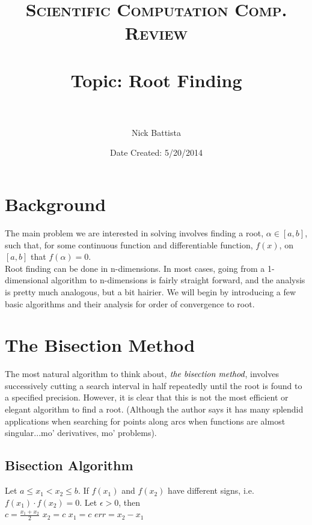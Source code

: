 \documentclass[paper=a4, fontsize=11pt]{scrartcl} %
\title{	
\normalfont \normalsize 
\textsc{Scientific Computation Comp. Review} \\ [25pt] %
\horrule{1pt} \\[0.05cm] %
\huge Topic: Root Finding \\ %
\horrule{1pt} \\[0.05cm] %
}
\author{Nick Battista} %
\date{\normalsize Date Created: 5/20/2014} %
\numberwithin{equation}{section} %
\numberwithin{figure}{section} %
\numberwithin{table}{section} %
\begin{document}
\maketitle %


\section{Background}

The main problem we are interested in solving involves finding a root, $\alpha\in [a,b]$, such that, for some continuous function and differentiable function, $f(x)$, on $[a,b]$ that $f(\alpha)=0$. \\

Root finding can be done in n-dimensions. In most cases, going from a 1-dimensional algorithm to n-dimensions is fairly straight forward, and the analysis is pretty much analogous, but a bit hairier. We will begin by introducing a few basic algorithms and their analysis for order of convergence to root.\\

\section{The Bisection Method}

The most natural algorithm to think about, $\emph{the bisection method}$, involves successively cutting a search interval in half repeatedly until the root is found to a specified precision. However, it is clear that this is not the most efficient or elegant algorithm to find a root. (Although the author says it has many splendid applications when searching for points along arcs when functions are almost singular...mo' derivatives, mo' problems).  \\

\subsection{Bisection Algorithm}

\begin{algorithmic}

\State Let $a\leq x_{1}<x_{2} \leq b$. If $f(x_1)$ and $f(x_2)$ have different signs, i.e. $f(x_1)\cdot f(x_2)=0$. Let $\epsilon>0$, then \\

	\State $c = \frac{x_1+x_2}{2}$
		\State $x_2 = c$
	\Else 
		\State $x_1 = c$
	\EndIf
	\State $err = x_2-x_1$
\EndWhile

\end{algorithmic}
\end{document}
